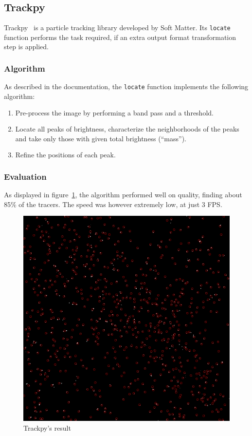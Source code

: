 \subsection{Trackpy}
\label{sec:locate:trackpy}

Trackpy~\cite{trackpy} is a particle tracking library developed by Soft Matter.
Its \texttt{locate} function performs the task required, if an extra output format transformation step is applied.

\subsubsection{Algorithm}

As described in the documentation, the \texttt{locate} function implements the following algorithm:
\begin{enumerate}
	\itemsep 0em
	\item Pre-process the image by performing a band pass and a threshold.
	\item Locate all peaks of brightness, characterize the neighborhoods of the peaks and take only those with given total brightness (``mass'').
	\item Refine the positions of each peak.
\end{enumerate}

\subsubsection{Evaluation}

As displayed in figure~\ref{fig:locate:trackpy}, the algorithm performed well on quality, finding about 85\% of the tracers.
The speed was however extremely low, at just 3 FPS.

\begin{figure}
	\centerline{\includegraphics[width=\locateimgsize]{images/locate/trackpy.png}}
	\caption{\centering Trackpy's result}
	\label{fig:locate:trackpy}
\end{figure}

